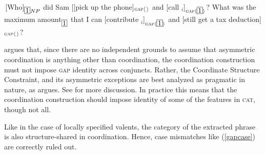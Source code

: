 \documentclass[output=paper
                ,modfonts
                ,nonflat
	        ,collection
	        ,collectionchapter
	        ,collectiontoclongg
 	        ,biblatex
                ,babelshorthands
                ,newtxmath
                ,draftmode
                ,colorlinks, citecolor=brown
]{./langsci/langscibook}
\begin{document}
\begin{exe}
\ex \begin{xlista}


\end{xlista}\label{cs2}
\end{exe}


\begin{exe}
\ex \begin{xlista}
\ex \,[Who]$_{\avmbox{1}NP}$ did Sam [[pick up the phone]$_{\textup{\textsc{gap}} \langle \, \rangle}$ and [call \spc$_i$]$_{\textup{\textsc{gap}} \langle \avmbox{1} \rangle}$?
\ex What was the maximum amount$_{\avmbox{1}}$ that
I can [contribute \spc$_i$]$_{\textup{\textsc{gap}} \langle \avmbox{1} \rangle}$ and [still get a tax deduction]$_{\textup{\textsc{gap}} \langle \, \rangle}$?
\end{xlista}\label{assym}
\end{exe}


\citet{chavesextr} argues that, since there are no independent grounds to assume that asymmetric coordination is anything other than coordination, the coordination construction must not impose \textsc{gap} identity across conjuncts. Rather, the Coordinate Structure Constraint, and its asymmetric exceptions are best analyzed as
pragmatic in nature, as \citet{kehler} argues. 
See  for more discussion.
In practice this means that the coordination construction should impose identity of some of the features in \textsc{cat}, though not all.

Like in the case of locally specified valents, the category of the extracted phrase is also structure-shared
in coordination. Hence, case mismatches like (\ref{gapcase}) are
correctly ruled out.


\begin{exe}
\ex
\begin{xlista}
\end{xlista}\label{gapcase}
\end{exe}
\end{document}
